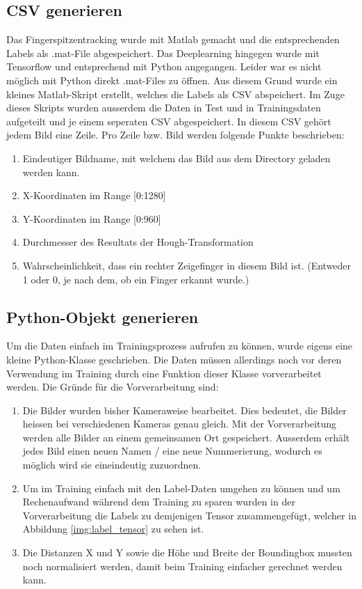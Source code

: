 \subsection{CSV generieren}
Das Fingerspitzentracking wurde mit Matlab gemacht und die entsprechenden Labels als .mat-File abgespeichert.
Das Deeplearning hingegen wurde mit Tensorflow und entsprechend mit Python angegangen. 
Leider war es nicht möglich mit Python direkt .mat-Files zu öffnen. 
Aus diesem Grund wurde ein kleines Matlab-Skript erstellt, welches die Labels als CSV abspeichert. 
Im Zuge dieses Skripts wurden ausserdem die Daten in Test und in Trainingsdaten aufgeteilt und je einem seperaten CSV abgespeichert.
In diesem CSV gehört jedem Bild eine Zeile. 
Pro Zeile bzw. Bild werden folgende Punkte beschrieben:
\begin{enumerate}
\item Eindeutiger Bildname, mit welchem das Bild aus dem Directory geladen werden kann. 
\item X-Koordinaten im Range [0:1280]
\item Y-Koordinaten im Range [0:960]
\item Durchmesser des Resultats der Hough-Transformation
\item Wahrscheinlichkeit, dass ein rechter Zeigefinger in diesem Bild ist. 
(Entweder 1 oder 0, je nach dem, ob ein Finger erkannt wurde.)
\end{enumerate}


\subsection{Python-Objekt generieren}
Um die Daten einfach im Trainingsprozess aufrufen zu können, wurde eigens eine kleine Python-Klasse geschrieben.
Die Daten müssen allerdings noch vor deren Verwendung im Training durch eine Funktion dieser Klasse vorverarbeitet werden.
Die Gründe für die Vorverarbeitung sind: 
\begin{enumerate}
\item Die Bilder wurden bisher Kameraweise bearbeitet.
Dies bedeutet, die Bilder heissen bei verschiedenen Kameras genau gleich.
Mit der Vorverarbeitung werden alle Bilder an einem gemeinsamen Ort gespeichert.
Ausserdem erhält jedes Bild einen neuen Namen / eine neue Nummerierung, wodurch es möglich wird sie eineindeutig zuzuordnen. 
\item Um im Training einfach mit den Label-Daten umgehen zu können und um Rechenaufwand während dem Training zu sparen wurden in der Vorverarbeitung die Labels zu demjenigen Tensor zusammengefügt, welcher in Abbildung \ref{img:label_tensor} zu sehen ist.
\item Die Distanzen X und Y sowie die Höhe und Breite der Boundingbox mussten noch normalisiert werden, damit beim Training einfacher gerechnet werden kann.
\end{enumerate}
